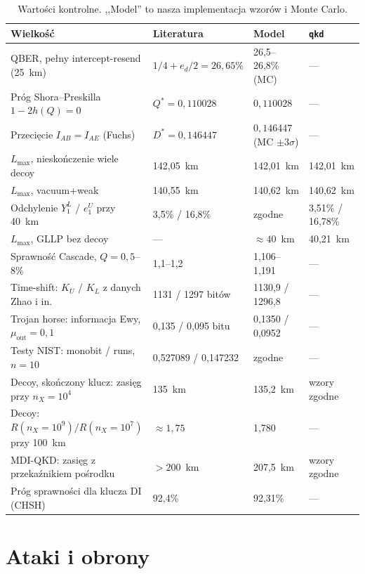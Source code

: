 \documentclass[11pt,a4paper]{article}
\begin{document}
\begin{table}[t]
  \centering
  \caption{Wartości kontrolne. ,,Model'' to nasza implementacja wzorów i Monte Carlo.}
  \label{tab:control}
  \small
  \begin{tabularx}{\linewidth}{L l l l}
    \toprule
    Wielkość & Literatura & Model & \texttt{qkd} \\
    \midrule
    QBER, pełny intercept-resend (25~km) & $1/4 + e_d/2 = 26{,}65\%$ & 26,5--26,8\% (MC) & --- \\
    Próg Shora--Preskilla $1 - 2h(Q) = 0$ & $Q^* = 0{,}110028$ & $0{,}110028$ & --- \\
    Przecięcie $I_{AB} = I_{AE}$ (Fuchs) & $D^* = 0{,}146447$ & $0{,}146447$ (MC $\pm 3\sigma$) & --- \\
    $L_{\max}$, nieskończenie wiele decoy & 142,05~km & 142,01~km & 142,01~km \\
    $L_{\max}$, vacuum+weak & 140,55~km & 140,62~km & 140,62~km \\
    Odchylenie $Y_1^L$ / $e_1^U$ przy 40~km & 3,5\% / 16,8\% & zgodne & 3,51\% / 16,78\% \\
    $L_{\max}$, GLLP bez decoy & --- & $\approx 40$~km & 40,21~km \\
    Sprawność Cascade, $Q = 0{,}5$--$8\%$ & 1,1--1,2 & 1,106--1,191 & --- \\
    Time-shift: $K_U$ / $K_L$ z danych Zhao i in.\ & 1131 / 1297 bitów & 1130,9 / 1296,8 & --- \\
    Trojan horse: informacja Ewy, $\mu_{\mathrm{out}} = 0{,}1$ & 0,135 / 0,095 bitu & 0,1350 / 0,0952 & --- \\
    Testy NIST: monobit / runs, $n = 10$ & 0,527089 / 0,147232 & zgodne & --- \\
    Decoy, skończony klucz: zasięg przy $n_X = 10^4$ & 135~km & 135,2~km & wzory zgodne \\
    Decoy: $R(n_X{=}10^9)/R(n_X{=}10^7)$ przy 100~km & $\approx 1{,}75$ & 1,780 & --- \\
    MDI-QKD: zasięg z przekaźnikiem pośrodku & $> 200$~km & 207,5~km & wzory zgodne \\
    Próg sprawności dla klucza DI (CHSH) & 92,4\% & 92,31\% & --- \\
    \bottomrule
  \end{tabularx}
\end{table}

\section{Ataki i obrony}
\end{document}
